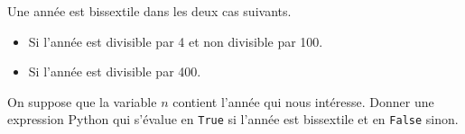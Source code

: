 \documentclass{magnolia}
\begin{document}




Une année est bissextile dans les deux cas suivants.
\begin{itemize}
\item Si l'année est divisible par 4 et non divisible par 100.
\item Si l'année est divisible par 400.
\end{itemize}
On suppose que la variable $n$ contient l'année qui nous intéresse. Donner une expression
Python qui s'évalue en \verb_True_ si l'année est bissextile et en \verb_False_
sinon. 





\end{document}
